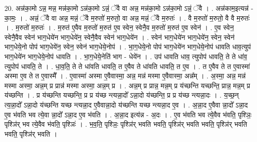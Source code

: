 \documentclass[17pt]{extarticle}
\begin{document}
20. अन्न॑का॒मो ऽन्न॒ मन्न॒ मन्न॑का॒मो ऽन्न॑का॒मो ऽन्नं॒ ॅवै वा अन्न॒ मन्न॑का॒मो ऽन्न॑का॒मो ऽन्नं॒ ॅवै । . अन्न॑काम॒इत्यन्न॑ - का॒मः॒ । . अन्नं॒ ॅवै वा अन्न॒ मन्नं॒ ॅवै म॒रुतो॑ म॒रुतो॒ वा अन्न॒ मन्नं॒ ॅवै म॒रुतः॑ । . वै म॒रुतो॑ म॒रुतो॒ वै वै म॒रुतः॑ । . म॒रुतो॑ म॒रुतः॑ । . म॒रुत॑ ए॒वैव म॒रुतो॑ म॒रुत॑ ए॒व स्वेन॒ स्वेनै॒व म॒रुतो॑ म॒रुत॑ ए॒व स्वेन॑ । . ए॒व स्वेन॒ स्वेनै॒वैव स्वेन॑ भाग॒धेये॑न भाग॒धेये॑न॒ स्वेनै॒वैव स्वेन॑ भाग॒धेये॑न । . स्वेन॑ भाग॒धेये॑न भाग॒धेये॑न॒ स्वेन॒ स्वेन॑ भाग॒धेये॒नो पोप॑ भाग॒धेये॑न॒ स्वेन॒ स्वेन॑ भाग॒धेये॒नोप॑ । . भा॒ग॒धेये॒नो पोप॑ भाग॒धेये॑न भाग॒धेये॒नोप॑ धावति धाव॒त्युप॑ भाग॒धेये॑न भाग॒धेये॒नोप॑ धावति । . भा॒ग॒धेये॒नेति॑ भाग - धेये॑न । . उप॑ धावति धाव॒ त्युपोप॑ धावति॒ ते ते धा॑व॒ त्युपोप॑ धावति॒ ते । . धा॒व॒ति॒ ते ते धा॑वति धावति॒ त ए॒वैव ते धा॑वति धावति॒ त ए॒व । . त ए॒वैव ते त ए॒वास्मा॑ अस्मा ए॒व ते त ए॒वास्मै᳚ । . ए॒वास्मा॑ अस्मा ए॒वैवास्मा॒ अन्न॒ मन्न॑ मस्मा ए॒वैवास्मा॒ अन्न᳚म् । . अ॒स्मा॒ अन्न॒ मन्न॑ मस्मा अस्मा॒ अन्न॒म् प्र प्रान्न॑ मस्मा अस्मा॒ अन्न॒म् प्र । . अन्न॒म् प्र प्रान्न॒ मन्न॒म् प्र य॑च्छन्ति यच्छन्ति॒ प्रान्न॒ मन्न॒म् प्र य॑च्छन्ति । . प्र य॑च्छन्ति यच्छन्ति॒ प्र प्र य॑च्छ न्त्यन्ना॒दो᳚ ऽन्ना॒दो य॑च्छन्ति॒ प्र प्र य॑च्छ न्त्यन्ना॒दः । . य॒च्छ॒न् त्य॒न्ना॒दो᳚ ऽन्ना॒दो य॑च्छन्ति यच्छ न्त्यन्ना॒द ए॒वैवान्ना॒दो य॑च्छन्ति यच्छ न्त्यन्ना॒द ए॒व । . अ॒न्ना॒द ए॒वैवा न्ना॒दो᳚ ऽन्ना॒द ए॒व भ॑वति भव त्ये॒वा न्ना॒दो᳚ ऽन्ना॒द ए॒व भ॑वति । . अ॒न्ना॒द इत्य॑न्न - अ॒दः । . ए॒व भ॑वति भव त्ये॒वैव भ॑वति॒ पृश्ञिः॒ पृश्ञि॑र् भव त्ये॒वैव भ॑वति॒ पृश्ञिः॑ । . भ॒व॒ति॒ पृश्ञिः॒ पृश्ञि॑र् भवति भवति॒ पृश्ञि॑र् भवति भवति॒ पृश्ञि॑र् भवति भवति॒ पृश्ञि॑र् भवति । \newline
\end{document}
